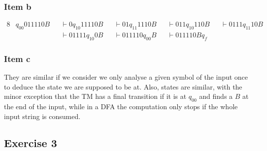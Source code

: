 {\begin{minipage}[c]{0.5\textwidth}
\begin{center}
	\end{center}
\end{minipage}
\subsubsection{Item b}
\begin{alignat*}{8}
	& q_{00} 011110B &&\vdash 0 q_{10} 11110B &&\vdash 01 q_{11} 1110B &&\vdash 011 q_{10} 110B &&\vdash 0111 q_{11} 10B \\
	&                &&\vdash 01111 q_{10} 0B &&\vdash 011110 q_{00} B &&\vdash 011110B q_f     &&
\end{alignat*}
\subsubsection{Item c}
They are similar if we consider we only analyse a given symbol of the input once to deduce the state we are supposed to be at. Also, states are similar, with the minor exception that the TM has a final transition if it is at $q_{00}$ and finds a $B$ at the end of the input, while in a DFA the computation only stops if the whole input string is consumed.
\pagebreak
\subsection{Exercise 3}
}
